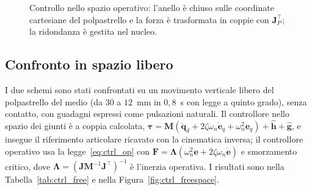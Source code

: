 \begin{figure}[!ht]
    \centering
    \caption{Controllo nello spazio operativo: l'anello è chiuso sulle coordinate cartesiane del polpastrello e la forza è trasformata in coppie con $\boldsymbol J_P^\top$; la ridondanza è gestita nel nucleo.}
    \label{fig:blk_op}
\end{figure}

\subsection{Confronto in spazio libero}

I due schemi sono stati confrontati su un movimento verticale libero del polpastrello del medio (da $30$ a $12$~mm in $0{,}8$~s con legge a quinto grado), senza contatto, con guadagni espressi come pulsazioni naturali. Il controllore nello spazio dei giunti è a coppia calcolata, $\boldsymbol\tau=\boldsymbol M(\ddot{\boldsymbol q}_d+2\zeta\omega_n\dot{\boldsymbol e}_q+\omega_n^2\boldsymbol e_q)+\hat{\boldsymbol h}+\hat{\boldsymbol g}$, e insegue il riferimento articolare ricavato con la cinematica inversa; il controllore operativo usa la legge~\eqref{eq:ctrl_op} con $\boldsymbol F=\boldsymbol\Lambda(\omega_n^2\boldsymbol e+2\zeta\omega_n\dot{\boldsymbol e})$ e smorzamento critico, dove $\boldsymbol\Lambda=(\boldsymbol J\boldsymbol M^{-1}\boldsymbol J^\top)^{-1}$ è l'inerzia operativa. I risultati sono nella Tabella~\ref{tab:ctrl_free} e nella Figura~\ref{fig:ctrl_freespace}.

